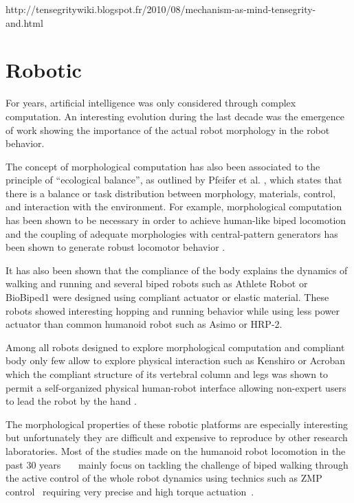 \begin{figure}[]
\centering
    \hfil
    \caption{}
    \label{fig:}
\end{figure}

http://tensegritywiki.blogspot.fr/2010/08/mechanism-as-mind-tensegrity-and.html

\section{Robotic} %
For years, artificial intelligence was only considered through complex computation.
An interesting evolution during the last decade was the emergence of work showing the importance of the actual robot morphology in the robot behavior.

The concept of morphological computation has also been associated to the principle of “ecological balance”, as outlined by Pfeifer et al.
\cite{pfeifer2005new}, which states that there is a balance or task distribution between morphology, materials, control, and interaction with the environment.
For example, morphological computation has been shown to be necessary in order to achieve human-like biped locomotion \cite{matsushita2005locomoting} and the coupling of adequate morphologies with central-pattern generators has been shown to generate robust locomotor behavior \cite{ijspeert2007swimming}\cite{steingrube2010self}.


It has also been shown that the compliance of the body explains the dynamics of walking and running \cite{Geyer2006} and several biped robots such as Athlete Robot \cite{niiyama2010athlete} or BioBiped1 \cite{radkhah2011concept} were designed using compliant actuator or elastic material.
These robots showed interesting hopping and running behavior while using less power actuator than common humanoid robot such as Asimo or HRP-2.

Among all robots designed to explore morphological computation and compliant body only few allow to explore physical interaction such as Kenshiro \cite{Asano2012} or Acroban which the compliant structure of its vertebral column and legs was shown to permit a self-organized physical human-robot interface allowing non-expert users to lead the robot by the hand \cite{Ly2011bio}\cite{Oudeyer2011}.

The morphological properties of these robotic platforms are especially interesting but unfortunately they are difficult and expensive to reproduce by other research laboratories.
Most of the studies made on the humanoid robot locomotion in the past 30 years~\cite{park1998biped}~\cite{aoi2005locomotion}~\cite{park1998biped} mainly focus on tackling the challenge of biped walking through the active control of the whole robot dynamics using technics such as ZMP control~\cite{vukobratovic2004zero} requiring very precise and high torque actuation~\cite{akachi2005development}.

